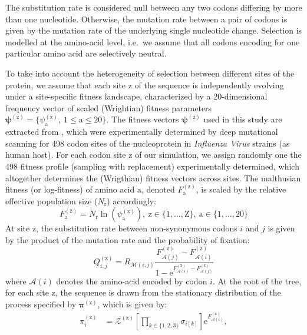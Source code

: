 \documentclass{article}
\newcommand{\UniDimArray}[1]{\bm{#1}} %
\newcommand{\e}{\text{e}} %
\newcommand{\Ner}{N_{\text{r}}} %
\newcommand{\mutmatrix}{R} %
\newcommand{\mutequi}{\sigma} %
\newcommand{\ci}{{i}} %
\newcommand{\cj}{{j}} %
\newcommand{\itoj}{\ci, \cj} %
\newcommand{\nuc}{\mathcal{M}} %
\newcommand{\nucitoj}{\nuc(\itoj)} %
\newcommand{\submatrix}{Q} %
\newcommand{\subequi}{\pi} %
\newcommand{\Subequi}{\UniDimArray{\subequi}} %
\newcommand{\aminoacid}{\text{a}} %
\newcommand{\SetAa}{\aminoacid \in \{1, \hdots, 20\} } %
\newcommand{\aaMap}{\mathcal{A}} %
\newcommand{\aai}{\aaMap(\ci)} %
\newcommand{\aaj}{\aaMap(\cj)} %
\newcommand{\scaledfit}{F} %
\newcommand{\Fiti}{\scaledfit_{\aai}} %
\newcommand{\Fitj}{\scaledfit_{\aaj}} %
\newcommand{\site}{\text{z}} %
\newcommand{\Nsite}{\text{Z}} %
\newcommand{\siteexp}{^{(\site)}} %
\newcommand{\Setsite}{\site \in \{1, \hdots, \Nsite\} } %
\newcommand{\profile}{\psi} %
\newcommand{\Profile}{\UniDimArray{\profile}} %
\begin{document}
The {substitution} rate is considered null between any two codons differing by more than one nucleotide.
Otherwise, the mutation rate between a pair of codons is given by the mutation rate of the underlying single nucleotide change.
Selection is modelled at the amino-acid level, i.e.~we assume that all codons encoding for one particular amino acid are selectively {neutral}.

To take into account the heterogeneity of selection between different sites of the protein, we assume that each site $\site$ of the sequence is independently evolving under a site-specific fitness landscape, characterized by a 20-dimensional frequency vector of scaled (Wrightian) fitness parameters $\Profile\siteexp = \{ \profile\siteexp_{\aminoacid},\ 1 \leq \aminoacid \leq 20 \}$.
The fitness vectors $\Profile\siteexp$ used in this study are extracted from \citet{Bloom2017}, which were experimentally determined by deep mutational scanning for 498 codon sites of the nucleoprotein in \textit{Influenza Virus} strains (as human host).
For each {codon} site $\site$ of our simulation, we assign randomly one the 498 fitness profile (sampling with replacement) experimentally determined, which altogether determines the (Wrigthian) fitness vectors across sites.
The malthusian fitness (or log-fitness) of amino acid $\aminoacid$, denoted $\scaledfit\siteexp_{\aminoacid}$, is scaled by the relative effective population size ($\Ner$) accordingly:
\begin{equation}
 \scaledfit\siteexp_{\aminoacid} = \Ner \ln \left( \profile\siteexp_{\aminoacid} \right),\ \Setsite, \ \SetAa
\end{equation}
At site $\site$, the {substitution} rate between {non-synonymous} codons $\ci$ and $\cj$ is given by the product of the mutation rate and the probability of fixation:
\begin{equation}
 \submatrix_{\itoj}\siteexp = \mutmatrix_{\nucitoj} \dfrac{\Fitj\siteexp - \Fiti\siteexp}{1 - \e^{\Fiti\siteexp - \Fitj\siteexp} } \label{eq:codonsubrates}
\end{equation}
where $\aai$ denotes the amino-acid encoded by codon $\ci$.
At the root of the tree, for each site $\site$, the sequence is drawn from the stationary distribution of the process specified by $\Subequi\siteexp$, which is given by:
\begin{align}
 \subequi_{\ci}\siteexp & = \mathcal{Z}\siteexp \left[\prod\limits_{k \in \{ 1, 2, 3 \}} \mutequi_{\ci[k]}\right] \e^{\Fiti\siteexp},
 \label{codonStationarity}
\end{align}
\end{document}
